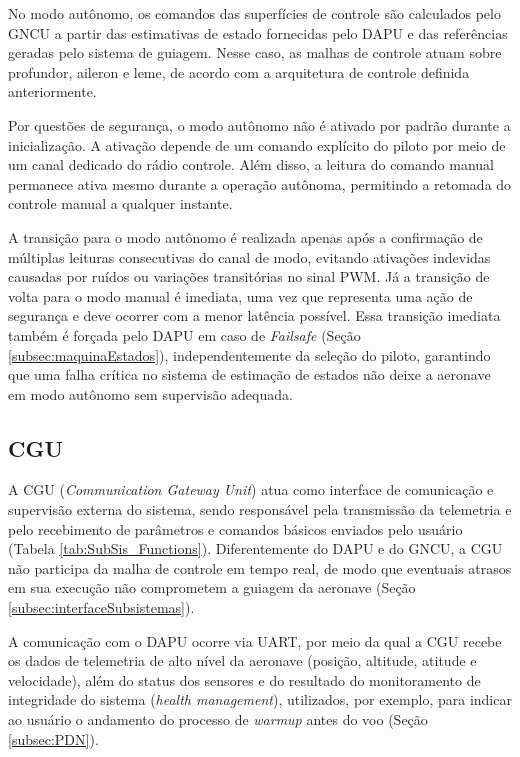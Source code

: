 No modo autônomo, os comandos das superfícies de controle são calculados pelo GNCU a partir das estimativas de estado fornecidas pelo DAPU e das referências geradas pelo sistema de guiagem. Nesse caso, as malhas de controle atuam sobre profundor, aileron e leme, de acordo com a arquitetura de controle definida anteriormente.

Por questões de segurança, o modo autônomo não é ativado por padrão durante a inicialização. A ativação depende de um comando explícito do piloto por meio de um canal dedicado do rádio controle. Além disso, a leitura do comando manual permanece ativa mesmo durante a operação autônoma, permitindo a retomada do controle manual a qualquer instante.

A transição para o modo autônomo é realizada apenas após a confirmação de múltiplas leituras consecutivas do canal de modo, evitando ativações indevidas causadas por ruídos ou variações transitórias no sinal PWM. Já a transição de volta para o modo manual é imediata, uma vez que representa uma ação de segurança e deve ocorrer com a menor latência possível. Essa transição imediata também é forçada pelo DAPU em caso de \textit{Failsafe} (Seção \ref{subsec:maquinaEstados}), independentemente da seleção do piloto, garantindo que uma falha crítica no sistema de estimação de estados não deixe a aeronave em modo autônomo sem supervisão adequada.

\subsection{CGU}

A CGU (\textit{Communication Gateway Unit}) atua como interface de comunicação e supervisão externa do sistema, sendo responsável pela transmissão da telemetria e pelo recebimento de parâmetros e comandos básicos enviados pelo usuário (Tabela \ref{tab:SubSis_Functions}). Diferentemente do DAPU e do GNCU, a CGU não participa da malha de controle em tempo real, de modo que eventuais atrasos em sua execução não comprometem a guiagem da aeronave (Seção \ref{subsec:interfaceSubsistemas}).

A comunicação com o DAPU ocorre via UART, por meio da qual a CGU recebe os dados de telemetria de alto nível da aeronave (posição, altitude, atitude e velocidade), além do status dos sensores e do resultado do monitoramento de integridade do sistema (\textit{health management}), utilizados, por exemplo, para indicar ao usuário o andamento do processo de \textit{warmup} antes do voo (Seção \ref{subsec:PDN}).

